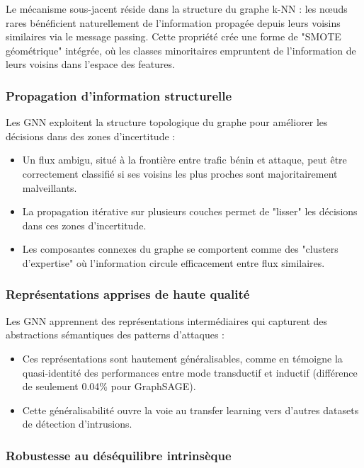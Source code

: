 ﻿\documentclass[11pt,a4paper]{article}
\begin{document}
Le mécanisme sous-jacent réside dans la structure du graphe k-NN : les nœuds rares bénéficient naturellement de l'information propagée depuis leurs voisins similaires via le message passing. Cette propriété crée une forme de "SMOTE géométrique" intégrée, où les classes minoritaires empruntent de l'information de leurs voisins dans l'espace des features.

\subsubsection{Propagation d'information structurelle}

Les GNN exploitent la structure topologique du graphe pour améliorer les décisions dans des zones d'incertitude :
\begin{itemize}
    \item Un flux ambigu, situé à la frontière entre trafic bénin et attaque, peut être correctement classifié si ses voisins les plus proches sont majoritairement malveillants.
    \item La propagation itérative sur plusieurs couches permet de "lisser" les décisions dans ces zones d'incertitude.
    \item Les composantes connexes du graphe se comportent comme des "clusters d'expertise" où l'information circule efficacement entre flux similaires.
\end{itemize}

\subsubsection{Représentations apprises de haute qualité}

Les GNN apprennent des représentations intermédiaires qui capturent des abstractions sémantiques des patterns d'attaques :
\begin{itemize}
    \item Ces représentations sont hautement généralisables, comme en témoigne la quasi-identité des performances entre mode transductif et inductif (différence de seulement 0.04\% pour GraphSAGE).
    \item Cette généralisabilité ouvre la voie au transfer learning vers d'autres datasets de détection d'intrusions.
\end{itemize}

\subsubsection{Robustesse au déséquilibre intrinsèque}
\end{document}
